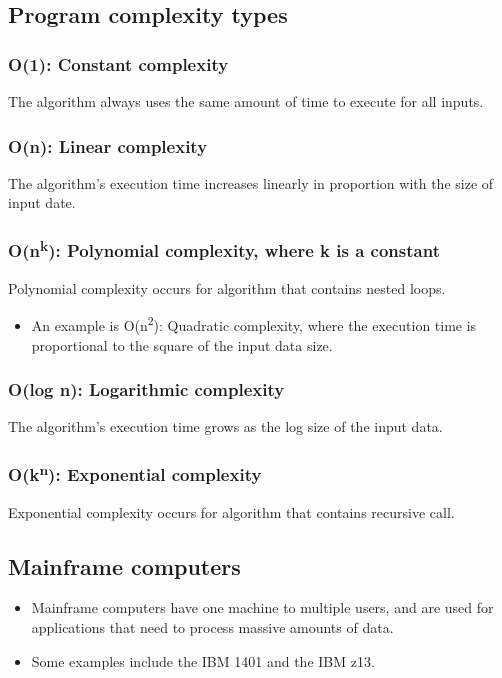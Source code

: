 \documentclass[11pt]{article}
\begin{document}
\subsection{Program complexity types}
\label{sec:org062fddb}

\subsubsection{O(1): Constant complexity}
\label{sec:org716b7b9}
The algorithm always uses the same amount of time to execute for all inputs.

\subsubsection{O(n): Linear complexity}
\label{sec:orgdd920a7}
The algorithm's execution time increases linearly in proportion with the size of input date.

\subsubsection{O(n\textsuperscript{k}): Polynomial complexity, where k is a constant}
\label{sec:org5edc2cc}
Polynomial complexity occurs for algorithm that contains nested loops.
\begin{itemize}
\item An example is O(n\textsuperscript{2}): Quadratic complexity, where the execution time is proportional to the square of the input data size.
\end{itemize}

\subsubsection{O(log n): Logarithmic complexity}
\label{sec:org26bac7c}
The algorithm's execution time grows as the log size of the input data.

\subsubsection{O(k\textsuperscript{n}): Exponential complexity}
\label{sec:orgb60fd99}
Exponential complexity occurs for algorithm that contains recursive call.

\subsection{Mainframe computers}
\label{sec:org57dd225}
\begin{itemize}
\item Mainframe computers have one machine to multiple users, and are used for applications that need to process massive amounts of data.
\item Some examples include the IBM 1401 and the IBM z13.
\end{itemize}
\end{document}
